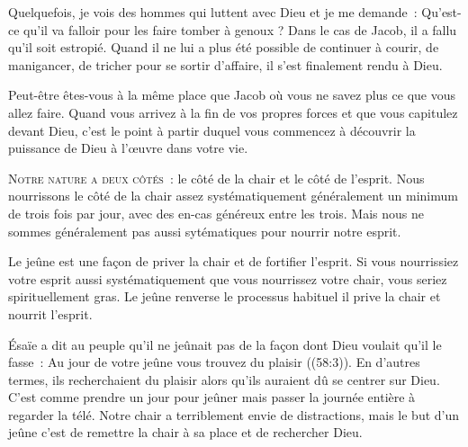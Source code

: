 Quelquefois, je vois des hommes qui luttent avec Dieu et je me demande~: 
 \og Qu'est-ce qu'il va falloir pour les faire tomber à genoux ? \fg{}
 Dans le cas de Jacob, il a fallu qu'il soit estropié.
 Quand il ne lui a plus été possible de continuer à courir, de manigancer,
 de tricher pour se sortir d'affaire, il s'est finalement rendu à Dieu. 

Peut-être êtes-vous à la même place que Jacob où vous ne savez plus
 ce que vous allez faire. Quand vous arrivez à la fin de vos propres forces
 et que vous capitulez devant Dieu, c'est le point à partir duquel
 vous commencez à découvrir la puissance de Dieu à l'œuvre dans votre vie. 

\dvrule






\lettrine{N}{otre nature a deux côtés~:}
 le côté de la chair et le côté de l'esprit.
 Nous nourrissons le côté de la chair assez systématiquement
 \ocadr généralement un minimum de trois fois par jour,
 avec des en-cas généreux entre les trois.
 Mais nous ne sommes généralement pas aussi sytématiques
 pour nourrir notre esprit. 

Le jeûne est une façon de priver la chair et de fortifier l'esprit.
 Si vous nourrissiez votre esprit aussi systématiquement
 que vous nourrissez votre chair, vous seriez spirituellement gras.
 Le jeûne renverse le processus habituel
 \ocadr il prive la chair et nourrit l'esprit. 


Ésaïe a dit au peuple qu'il ne jeûnait pas de la façon dont Dieu
 voulait qu'il le fasse~:
 \og Au jour de votre jeûne vous trouvez du plaisir \fg{}
 ((58:3)). En d'autres termes, ils recherchaient du plaisir
 alors qu'ils auraient dû se centrer sur Dieu. C'est comme prendre
 un jour pour jeûner mais passer la journée entière à regarder la télé.
 Notre chair a terriblement envie de distractions, mais le but d'un jeûne
 c'est de remettre la chair à sa place et de rechercher Dieu. 

